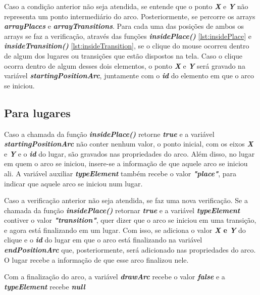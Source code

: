 \documentclass[
	12pt,				%
	openright,			%
	oneside,			%
	a4paper,			%
	english,			%
	brazil				%
	]{abntex2}
\begin{document}
Caso a condição anterior não seja atendida, se entende que o ponto \textbf{\textit{X}} e \textbf{\textit{Y}} não representa um ponto intermediário do arco. Posteriormente, se percorre os arrays \textbf{\textit{arrayPlaces}} e \textbf{\textit{arrayTransitions}}. Para cada uma das posições de ambos os arrays se faz a verificação, através das funções \textbf{\textit{insidePlace()}} \ref{lst:insidePlace} e \textbf{\textit{insideTransition()}} \ref{lst:insideTransition}, se o clique do mouse ocorreu dentro de algum dos lugares ou transições que estão dispostos na tela. Caso o clique ocorra dentro de algum desses dois elementos, o ponto \textbf{\textit{X}} e \textbf{\textit{Y}} será gravado na variável \textbf{\textit{startingPositionArc}}, juntamente com o \textbf{\textit{id}} do elemento em que o arco se iniciou. 

\subsection*{Para lugares}

Caso a chamada da função \textbf{\textit{insidePlace()}} retorne \textbf{\textit{true}} e a variável \textbf{\textit{startingPositionArc}} não conter nenhum valor, o ponto inicial, com os eixos \textbf{\textit{X}} e \textbf{\textit{Y}} e o \textbf{\textit{id}} do lugar, são gravados nas propriedades do arco. Além disso, no lugar em quem o arco se iniciou, insere-se a informação de que aquele arco se iniciou ali. A variável auxiliar \textbf{\textit{typeElement}} também recebe o valor \textbf{\textit{"place"}}, para indicar que aquele arco se iniciou num lugar. 

Caso a verificação anterior não seja atendida, se faz uma nova verificação. Se a chamada da função \textbf{\textit{insidePlace()}} retornar \textbf{\textit{true}} e a variável \textbf{\textit{typeElement}} contiver o valor \textbf{\textit{"transition"}}, quer dizer que o arco se iniciou em uma transição, e agora está finalizando em um lugar. Com isso, se adiciona o valor \textbf{\textit{X} e \textbf{\textit{Y}}} do clique e o \textbf{\textit{id}} do lugar em que o arco está finalizando na variável \textbf{\textit{endPositionArc}} que, posteriormente, será adicionado nas propriedades do arco. O lugar recebe a informação de que esse arco finalizou nele.

Com a finalização do arco, a variável \textbf{\textit{drawArc}} recebe o valor \textbf{\textit{false}} e a \textbf{\textit{typeElement}} recebe \textbf{\textit{null}}
\end{document}
